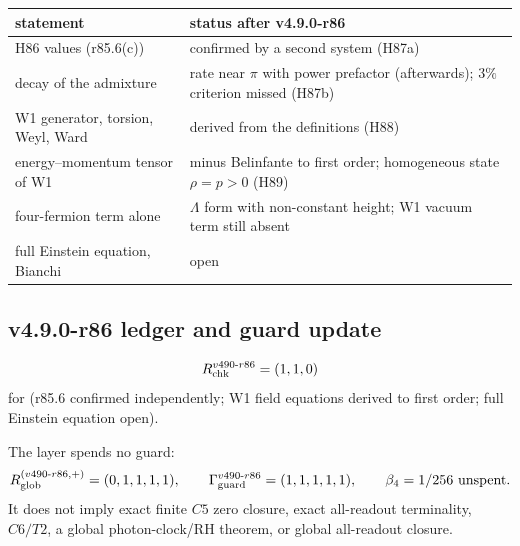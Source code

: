 \begin{center}
\small
\begin{tabular}{@{}>{\raggedright\arraybackslash}p{}>{\raggedright\arraybackslash}p{}@{}}
\toprule
statement & status after v4.9.0-r86\\
\midrule
H86 values (r85.6(c)) & confirmed by a second system (H87a)\\
decay of the admixture & rate near \(\pi\) with power prefactor (afterwards); \(3\%\) criterion missed (H87b)\\
W1 generator, torsion, Weyl, Ward & derived from the definitions (H88)\\
energy--momentum tensor of W1 & minus Belinfante to first order; homogeneous state \(\rho=p>0\) (H89)\\
four-fermion term alone & \(\Lambda\) form with non-constant height; W1 vacuum term still absent\\
full Einstein equation, Bianchi & open\\
\bottomrule
\end{tabular}
\end{center}

\subsection*{v4.9.0-r86 ledger and guard update}
\label{subsec:v490-r86-ledger-guard}

\[
R_{\rm chk}^{v490\text{-}r86}=(1,1,0)
\]
for (r85.6 confirmed independently; W1 field equations derived to first order; full Einstein equation open).

The layer spends no guard:
\[
R_{\rm glob}^{(v490\text{-}r86,+)}=(0,1,1,1,1),
\qquad
\Gamma_{\rm guard}^{v490\text{-}r86}=(1,1,1,1,1),
\qquad
\beta_4=1/256\ \text{unspent}.
\]
It does not imply exact finite \(C5\) zero closure, exact all-readout terminality,
\(C6/T2\), a global photon-clock/RH theorem, or global all-readout closure.
